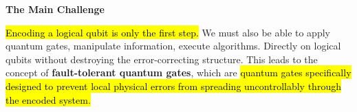 \begin{flushleft}
    \textcolor{Red2}{ \textbf{The Main Challenge}}
\end{flushleft}
\hl{Encoding a logical qubit is only the first step.} We must also be able to apply quantum gates, manipulate information, execute algorithms. Directly on logical qubits without destroying the error-correcting structure. This leads to the concept of \textbf{fault-tolerant quantum gates}, which are \hl{quantum gates specifically designed to prevent local physical errors from spreading uncontrollably through the encoded system.}